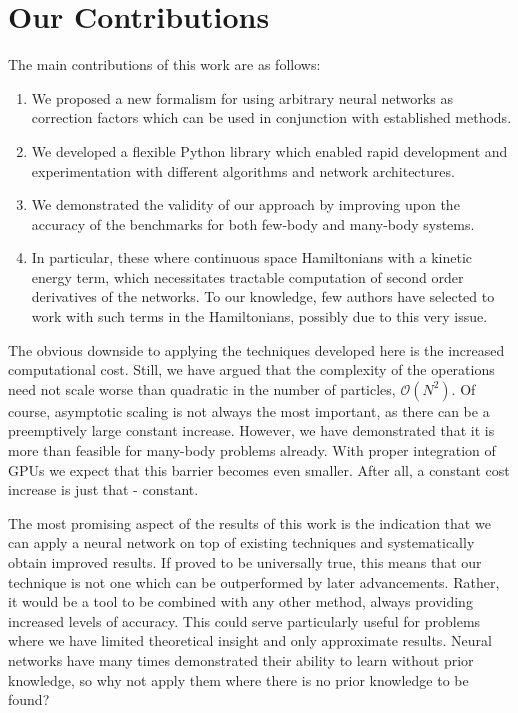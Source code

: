 \documentclass[Thesis.tex]{subfiles}
\begin{document}
\section{Our Contributions}

The main contributions of this work are as follows:

\begin{enumerate}
  \item We proposed a new formalism for using arbitrary neural networks as
    correction factors which can be used in conjunction with established
    methods.
  \item We developed a flexible Python library which enabled rapid development
    and experimentation with different algorithms and network architectures.
  \item We demonstrated the validity of our approach by 
    improving upon the accuracy of the benchmarks for both few-body and
    many-body systems.
    \item In particular, these where continuous space Hamiltonians with a
      kinetic energy term, which necessitates tractable computation of second
      order derivatives of the networks. To our knowledge, few authors have
      selected to work with such terms in the Hamiltonians, possibly due to this
      very issue.
\end{enumerate}

The obvious downside to applying the techniques developed here is the increased
computational cost. Still, we have argued that the complexity of the operations
need not scale worse than quadratic in the number of particles,
$\mathcal{O}(N^2)$. Of course, asymptotic scaling is not always the most
important, as there can be a preemptively large constant increase. However, we
have demonstrated that it is more than feasible for many-body problems already.
With proper integration of GPUs we expect that this barrier becomes even
smaller. After all, a constant cost increase is just that - constant.

The most promising aspect of the results of this work is the indication that we
can apply a neural network on top of existing techniques and systematically
obtain improved results. If proved to be universally true, this means that our
technique is not one which can be outperformed by later advancements. Rather, it
would be a tool to be combined with any other method, always providing increased
levels of accuracy. This could serve particularly useful for problems where we
have limited theoretical insight and only approximate results. Neural networks
have many times demonstrated their ability to learn without prior knowledge, so
why not apply them where there is no prior knowledge to be found?
\end{document}
